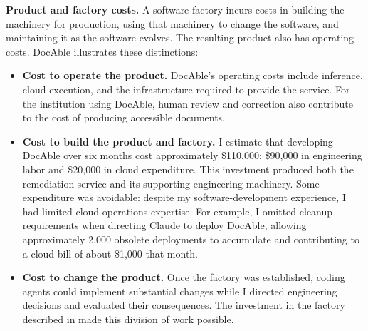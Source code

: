 \textbf{Product and factory costs.} A software factory incurs costs in building the machinery for production, using that machinery to change the software, and maintaining it as the software evolves. The resulting product also has operating costs. DocAble illustrates these distinctions:

\begin{itemize}
\tightlist
\item
  \textbf{Cost to operate the product.} DocAble's operating costs include inference, cloud execution, and the infrastructure required to provide the service. For the institution using DocAble, human review and correction also contribute to the cost of producing accessible documents.
\item
  \textbf{Cost to build the product and factory.} I estimate that developing DocAble over six months cost approximately \$110,000: \$90,000 in engineering labor and \$20,000 in cloud expenditure. This investment produced both the remediation service and its supporting engineering machinery. Some expenditure was avoidable: despite my software-development experience, I had limited cloud-operations expertise. For example, I omitted cleanup requirements when directing Claude to deploy DocAble, allowing approximately 2,000 obsolete deployments to accumulate and contributing to a cloud bill of about \$1,000 that month.
\item
  \textbf{Cost to change the product.} Once the factory was established, coding agents could implement substantial changes while I directed engineering decisions and evaluated their consequences. The investment in the factory described in  made this division of work possible.
\end{itemize}

